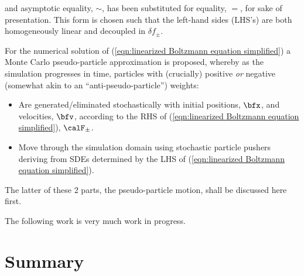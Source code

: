     and asymptotic equality, $\sim$, has been substituted for equality, $=$, for sake of presentation. This form is chosen such that the left-hand sides (LHS's) are both homogeneously linear and decoupled in $\delta\!f_{\pm}$.


    For the numerical solution of (\ref{eqn:linearized Boltzmann equation simplified}) a Monte Carlo pseudo-particle approximation is proposed, whereby as the simulation progresses in time, particles with (crucially) positive \emph{or} negative (somewhat akin to an ``anti-pseudo-particle'') weights:
    \begin{itemize}
        \item  Are generated/eliminated stochastically with initial positions, $\bfx$, and velocities, $\bfv$, according to the RHS of (\ref{eqn:linearized Boltzmann equation simplified}), $\calF_{\pm}$.
        \item  Move through the simulation domain using stochastic particle pushers deriving from SDEs determined by the LHS of (\ref{eqn:linearized Boltzmann equation simplified}).
    \end{itemize}
    The latter of these 2 parts, the pseudo-particle motion, shall be discussed here first.

    \begin{remark}
        The following work is very much work in progress.
    \end{remark}


    
    



    \section*{Summary}
    